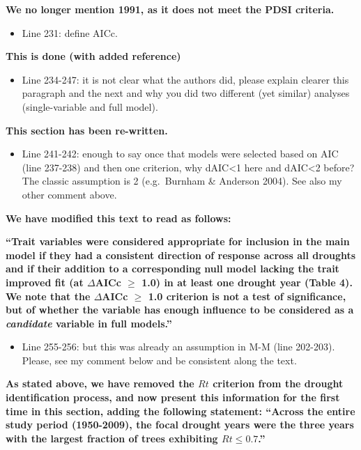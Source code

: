\documentclass[
]{article}
\providecommand{\tightlist}{%
  \setlength{\itemsep}{0pt}\setlength{\parskip}{0pt}}
\begin{document}
\textbf{We no longer mention 1991, as it does not meet the PDSI
criteria.}

\begin{itemize}
\tightlist
\item
  Line 231: define AICc.
\end{itemize}

\textbf{This is done (with added reference)}

\begin{itemize}
\tightlist
\item
  Line 234-247: it is not clear what the authors did, please explain
  clearer this paragraph and the next and why you did two different (yet
  similar) analyses (single-variable and full model).
\end{itemize}

\textbf{This section has been re-written.}

\begin{itemize}
\tightlist
\item
  Line 241-242: enough to say once that models were selected based on
  AIC (line 237-238) and then one criterion, why dAIC\textless1 here and
  dAIC\textless2 before? The classic assumption is 2 (e.g.~Burnham \&
  Anderson 2004). See also my other comment above.
\end{itemize}

\textbf{We have modified this text to read as follows:}

\textbf{``Trait variables were considered appropriate for inclusion in
the main model if they had a consistent direction of response across all
droughts and if their addition to a corresponding null model lacking the
trait improved fit (at \(\Delta\)AICc \(\ge\) 1.0) in at least one
drought year (Table 4). We note that the \(\Delta\)AICc \(\ge\) 1.0
criterion is not a test of significance, but of whether the variable has
enough influence to be considered as a \emph{candidate} variable in full
models.''}

\begin{itemize}
\tightlist
\item
  Line 255-256: but this was already an assumption in M-M (line
  202-203). Please, see my comment below and be consistent along the
  text.
\end{itemize}

\textbf{As stated above, we have removed the \(Rt\) criterion from the
drought identification process, and now present this information for the
first time in this section, adding the following statement: ``Across the
entire study period (1950-2009), the focal drought years were the three
years with the largest fraction of trees exhibiting \(Rt \le 0.7\).''}
\end{document}
